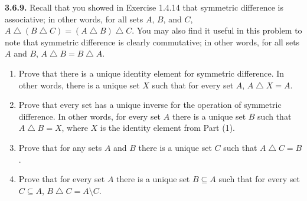 \documentclass[12pt]{amsart}
\newenvironment{statement}[1]{\smallskip\noindent\color[rgb]{.6627, .3529, .6314} {\bf #1.}}{}
\theoremstyle{definition}
\theoremstyle{remark}
\begin{document}
\begin{statement}{3.6.9}
Recall that you showed in Exercise 1.4.14 that symmetric difference is associative; in other words, for all sets $A$, $B$, and $C$, $A \bigtriangleup (B \bigtriangleup C) = (A \bigtriangleup B) \bigtriangleup C$.
You may also find it useful in this problem to note that symmetric difference is clearly commutative; in other words, for all sets $A$ and $B$, $A \bigtriangleup B = B \bigtriangleup A$.
\begin{enumerate}
	\item Prove that there is a unique identity element for symmetric difference.
	In other words, there is a unique set $X$ such that for every set $A$, $A \bigtriangleup X = A$.
	
	\item Prove that every set has a unique inverse for the operation of symmetric difference.
	In other words, for every set $A$ there is a unique set $B$ such that $A \bigtriangleup B = X$,
	where $X$ is the identity element from Part (1).
	
	\item Prove that for any sets $A$ and $B$ there is a unique set $C$ such that 
	$A \bigtriangleup C = B$.
	
	\item Prove that for every set $A$ there is a unique set $B \subseteq A$ such that for every set
	$C \subseteq A$, $B \bigtriangleup C = A \setminus C$.
\end{enumerate}
\end{statement}
\end{document}
